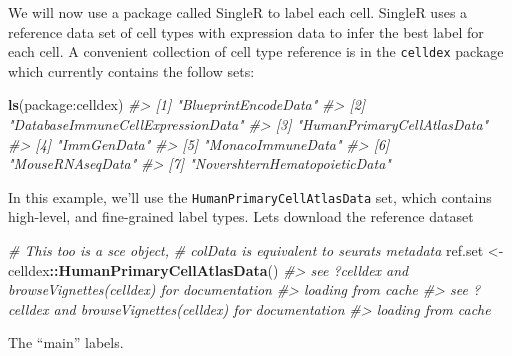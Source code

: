 \documentclass[
]{book}
\newenvironment{Shaded}{\begin{snugshade}}{\end{snugshade}}
\newcommand{\CommentTok}[1]{\textcolor[rgb]{0.56,0.35,0.01}{\textit{#1}}}
\newcommand{\FunctionTok}[1]{\textcolor[rgb]{0.13,0.29,0.53}{\textbf{#1}}}
\newcommand{\NormalTok}[1]{#1}
\newcommand{\OtherTok}[1]{\textcolor[rgb]{0.56,0.35,0.01}{#1}}
\newcommand{\SpecialCharTok}[1]{\textcolor[rgb]{0.81,0.36,0.00}{\textbf{#1}}}
\newcommand{\StringTok}[1]{\textcolor[rgb]{0.31,0.60,0.02}{#1}}
\begin{document}
We will now use a package called SingleR to label each cell. SingleR uses a reference data set of cell types with expression data to infer the best label for each cell. A convenient collection of cell type reference is in the \texttt{celldex} package which currently contains the follow sets:

\begin{Shaded}
\begin{Highlighting}[]
\FunctionTok{ls}\NormalTok{(}\StringTok{\textquotesingle{}package:celldex\textquotesingle{}}\NormalTok{)}
\CommentTok{\#\textgreater{} [1] "BlueprintEncodeData"             }
\CommentTok{\#\textgreater{} [2] "DatabaseImmuneCellExpressionData"}
\CommentTok{\#\textgreater{} [3] "HumanPrimaryCellAtlasData"       }
\CommentTok{\#\textgreater{} [4] "ImmGenData"                      }
\CommentTok{\#\textgreater{} [5] "MonacoImmuneData"                }
\CommentTok{\#\textgreater{} [6] "MouseRNAseqData"                 }
\CommentTok{\#\textgreater{} [7] "NovershternHematopoieticData"}
\end{Highlighting}
\end{Shaded}

In this example, we'll use the \texttt{HumanPrimaryCellAtlasData} set, which contains high-level, and fine-grained label types. Lets download the reference dataset

\begin{Shaded}
\begin{Highlighting}[]
\CommentTok{\# This too is a sce object,}
\CommentTok{\# colData is equivalent to seurat\textquotesingle{}s metadata}
\NormalTok{ref.set }\OtherTok{\textless{}{-}}\NormalTok{ celldex}\SpecialCharTok{::}\FunctionTok{HumanPrimaryCellAtlasData}\NormalTok{()}
\CommentTok{\#\textgreater{} see ?celldex and browseVignettes(\textquotesingle{}celldex\textquotesingle{}) for documentation}
\CommentTok{\#\textgreater{} loading from cache}
\CommentTok{\#\textgreater{} see ?celldex and browseVignettes(\textquotesingle{}celldex\textquotesingle{}) for documentation}
\CommentTok{\#\textgreater{} loading from cache}
\end{Highlighting}
\end{Shaded}

The ``main'' labels.
\end{document}
